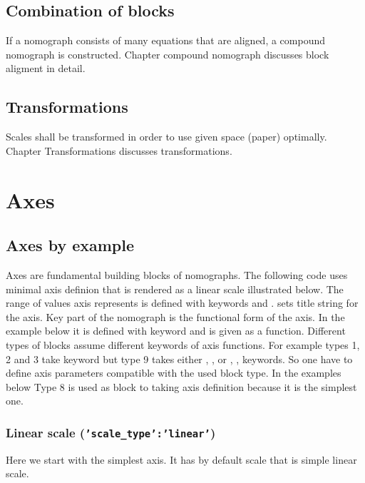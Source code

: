 \documentclass[a4paper,11pt,english]{sphinxmanual}
\begin{document}
\section{Combination of blocks}
\label{main_page:combination-of-blocks}
If a nomograph consists of many equations that are aligned, a compound nomograph is constructed. Chapter compound nomograph
discusses block aligment in detail.


\section{Transformations}
\label{main_page:transformations}
Scales shall be transformed in order to use given space (paper) optimally. Chapter Transformations discusses transformations.


\chapter{Axes}
\label{axes/axes:axes}\label{axes/axes::doc}

\section{Axes by example}
\label{axes/axes:axes-by-example}
Axes are fundamental building blocks of nomographs. The following code uses minimal axis definion  that is
rendered as a linear scale illustrated below. The range of values axis represents is defined with keywords 
and .  sets title string for the axis. Key part of the nomograph is the functional form of the axis.
In the example below it is defined with keyword  and is given as a function. Different types of blocks assume different keywords
of axis functions. For example types 1, 2 and 3 take keyword  but type 9 takes either , ,  or
, ,  keywords. So one have to define axis parameters compatible with the used block type.
In the examples below Type 8 is used as block to taking axis definition because it is the simplest one.


\subsection{Linear scale (\texttt{'scale\_type':'linear'})}
\label{axes/axes:linear-scale-scale-type-linear}\label{axes/axes:axes-ex-code-ref}
Here we start with the simplest axis. It has by default scale  that is simple linear scale.
\end{document}
